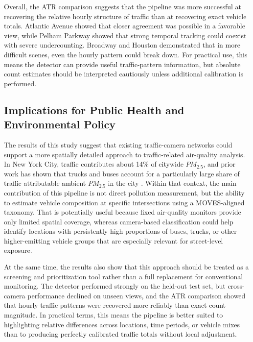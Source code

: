 Overall, the ATR comparison suggests that the pipeline was more successful at recovering 
the relative hourly structure of traffic than at recovering exact vehicle totals. 
Atlantic Avenue showed that closer agreement was possible in a favorable view, while 
Pelham Parkway showed that strong temporal tracking could coexist with severe 
undercounting. Broadway and Houston demonstrated that in more difficult scenes,
even the hourly pattern could break down. For practical use, this means the detector
can provide useful traffic-pattern information, but absolute count estimates should
be interpreted cautiously unless additional calibration is performed.


\subsection{Implications for Public Health and Environmental Policy}

The results of this study suggest that existing traffic-camera networks could 
support a more spatially detailed approach to traffic-related air-quality analysis.
In New York City, traffic contributes about 14\% of citywide $PM_{2.5}$, and prior
work has shown that trucks and buses account for a particularly large share of 
traffic-attributable ambient $PM_{2.5}$ in the city \cite{nyc_department_of_health_and_mental_hygiene_traffic_nodate}.
Within that context, the main
contribution of this pipeline is not direct pollution measurement, but the ability
to estimate vehicle composition at specific intersections using a MOVES-aligned taxonomy.
That is potentially useful because fixed air-quality monitors provide only limited 
spatial coverage, whereas camera-based classification could help identify locations 
with persistently high proportions of buses, trucks, or other higher-emitting vehicle
groups that are especially relevant for street-level exposure.

At the same time, the results also show that this approach should be treated as a 
screening and prioritization tool rather than a full replacement for conventional 
monitoring. The detector performed strongly on the held-out test set, but cross-camera 
performance declined on unseen views, and the ATR comparison showed that hourly 
traffic patterns were recovered more reliably than exact count magnitude. In practical
terms, this means the pipeline is better suited to highlighting relative differences
across locations, time periods, or vehicle mixes than to producing perfectly calibrated
traffic totals without local adjustment. 

